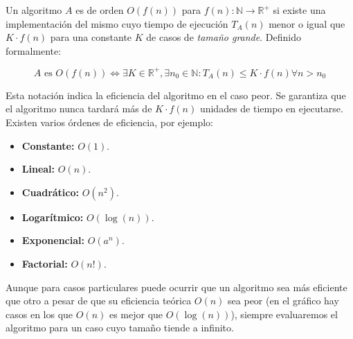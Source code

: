 Un algoritmo $A$ es de orden $O(f(n))$ para $f(n):\mathbb{N}\rightarrow\mathbb{R}^+$ si existe una implementación del mismo cuyo tiempo de ejecución $T_A(n)$ menor o igual que $K\cdot f(n)$ para una constante $K$ de casos de \textit{tamaño grande}.
Definido formalmente:

\[A\text{ es }O(f(n))\Leftrightarrow\exists K \in \mathbb{R}^+,\exists n_0\in\mathbb{N}:T_A(n)\leq K\cdot f(n)\forall n>n_0\]

Esta notación indica la eficiencia del algoritmo en el caso peor.
Se garantiza que el algoritmo nunca tardará más de $K\cdot f(n)$ unidades de tiempo en ejecutarse.
Existen varios órdenes de eficiencia, por ejemplo:

\begin{itemize}
	\item\textbf{Constante:} $O(1)$.
	\item\textbf{Lineal:} $O(n)$.
	\item\textbf{Cuadrático:} $O(n^2)$.
	\item\textbf{Logarítmico:} $O(\log(n))$.
	\item\textbf{Exponencial:} $O(a^n)$.
	\item\textbf{Factorial:} $O(n!)$.
\end{itemize}

Aunque para casos particulares puede ocurrir que un algoritmo sea más eficiente que otro a pesar de que su eficiencia teórica $O(n)$ sea peor (en el gráfico hay casos en los que $O(n)$ es mejor que $O(\log(n))$), siempre evaluaremos el algoritmo para un caso cuyo tamaño tiende a infinito.

\begin{center}
\end{center}

